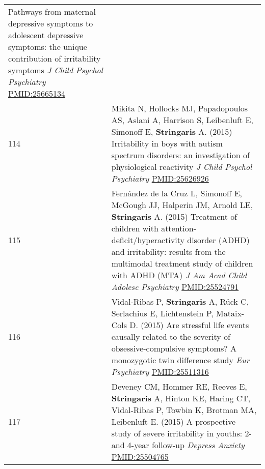 \documentclass[
]{article}
\begin{document}
\begin{longtable}[]{@{}ll@{}}
\begin{minipage}[t]{0.94\columnwidth}
Pathways from maternal depressive symptoms to adolescent depressive
symptoms: the unique contribution of irritability symptoms \emph{J Child
Psychol Psychiatry} \url{PMID:25665134}\strut
\end{minipage}\tabularnewline
\begin{minipage}[t]{0.01\columnwidth}\raggedright
114\strut
\end{minipage} & \begin{minipage}[t]{0.94\columnwidth}\raggedright
Mikita N, Hollocks MJ, Papadopoulos AS, Aslani A, Harrison S, Leibenluft
E, Simonoff E, \textbf{Stringaris} A. (2015) Irritability in boys with
autism spectrum disorders: an investigation of physiological reactivity
\emph{J Child Psychol Psychiatry} \url{PMID:25626926}\strut
\end{minipage}\tabularnewline
\begin{minipage}[t]{0.01\columnwidth}\raggedright
115\strut
\end{minipage} & \begin{minipage}[t]{0.94\columnwidth}\raggedright
Fernández de la Cruz L, Simonoff E, McGough JJ, Halperin JM, Arnold LE,
\textbf{Stringaris} A. (2015) Treatment of children with
attention-deficit/hyperactivity disorder (ADHD) and irritability:
results from the multimodal treatment study of children with ADHD (MTA)
\emph{J Am Acad Child Adolesc Psychiatry} \url{PMID:25524791}\strut
\end{minipage}\tabularnewline
\begin{minipage}[t]{0.01\columnwidth}\raggedright
116\strut
\end{minipage} & \begin{minipage}[t]{0.94\columnwidth}\raggedright
Vidal-Ribas P, \textbf{Stringaris} A, Rück C, Serlachius E, Lichtenstein
P, Mataix-Cols D. (2015) Are stressful life events causally related to
the severity of obsessive-compulsive symptoms? A monozygotic twin
difference study \emph{Eur Psychiatry} \url{PMID:25511316}\strut
\end{minipage}\tabularnewline
\begin{minipage}[t]{0.01\columnwidth}\raggedright
117\strut
\end{minipage} & \begin{minipage}[t]{0.94\columnwidth}\raggedright
Deveney CM, Hommer RE, Reeves E, \textbf{Stringaris} A, Hinton KE,
Haring CT, Vidal-Ribas P, Towbin K, Brotman MA, Leibenluft E. (2015) A
prospective study of severe irritability in youths: 2- and 4-year
follow-up \emph{Depress Anxiety} \url{PMID:25504765}\strut

\end{minipage}
\end{longtable}
\end{document}
